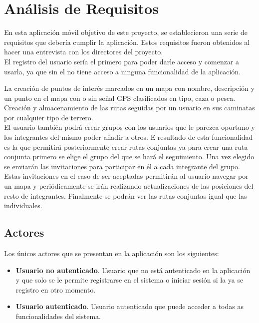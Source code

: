 
\section{Análisis de Requisitos}


En esta aplicación móvil objetivo de este proyecto, se establecieron una serie de requisitos que debería cumplir la aplicación. Estos requisitos fueron obtenidos al  hacer una entrevista con los directores del proyecto.\\

El registro del usuario sería el primero para poder darle acceso y comenzar a usarla, ya que sin el no tiene acceso a ninguna funcionalidad de la aplicación.

La creación de puntos de interés marcados en un mapa con nombre, descripción y un punto en el mapa con o sin señal GPS clasificados en tipo, caza o pesca. \\

Creación y almacenamiento de las rutas seguidas por un usuario en sus caminatas por cualquier tipo de terrero.\\

El usuario también podrá crear grupos con los usuarios que le parezca oportuno y los integrantes del mismo poder añadir a otros. E resultado de esta funcionalidad es la que permitirá posteriormente crear rutas conjuntas ya para crear una ruta conjunta primero se elige el grupo del que se hará el seguimiento. Una vez elegido se enviarán las invitaciones para participar en él a cada integrante del grupo. Estas invitaciones en el caso de ser aceptadas permitirán al usuario navegar por un mapa y periódicamente se irán realizando actualizaciones de las posiciones del resto de integrantes. Finalmente se podrán ver las rutas conjuntas igual que las individuales.
\subsection{Actores}

Los únicos actores que se presentan en la  aplicación son los siguientes:
\begin{itemize}
\item \textbf{Usuario no  autenticado}. Usuario que no está autenticado en la aplicación y que solo
se le permite registrarse en el  sistema o iniciar sesión si la ya se registro en otro momento.
\item \textbf{Usuario  autenticado}. Usuario autenticado que puede acceder a todas as funcionalidades
del sistema.
\end{itemize}


